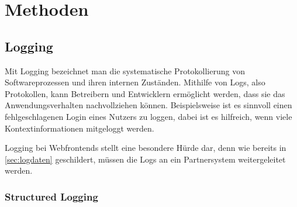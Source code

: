 

\vspace{-\baselineskip}

\section{Methoden}

\subsection{Logging}


Mit Logging bezeichnet man die systematische Protokollierung von Softwareprozessen und ihren internen Zuständen. Mithilfe von Logs, also Protokollen, kann Betreibern und Entwicklern ermöglicht werden, dass sie das Anwendungsverhalten nachvollziehen können. Beispielsweise ist es sinnvoll einen fehlgeschlagenen Login eines Nutzers zu loggen, dabei ist es hilfreich, wenn viele Kontextinformationen mitgeloggt werden. %

Logging bei Webfrontends stellt eine besondere Hürde dar, denn wie bereits in \autoref{sec:logdaten} geschildert, müssen die Logs an ein Partnersystem weitergeleitet werden.

\subsubsection{Structured Logging}

